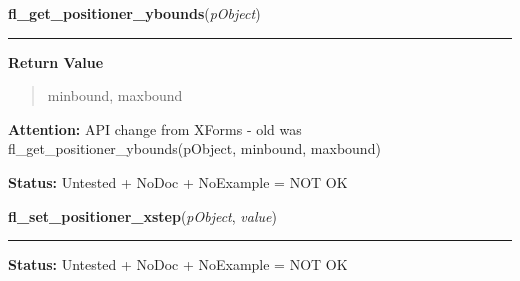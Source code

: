     \label{xformslib:library:fl_get_positioner_ybounds}

    \vspace{0.5ex}

\hspace{.8\funcindent}\begin{boxedminipage}{\funcwidth}

    \raggedright \textbf{fl\_get\_positioner\_ybounds}(\textit{pObject})

    \vspace{-1.5ex}

    \rule{\textwidth}{0.5\fboxrule}
\setlength{\parskip}{2ex}
\setlength{\parskip}{1ex}
      \textbf{Return Value}
    \vspace{-1ex}

      \begin{quote}
      minbound, maxbound

      \end{quote}

\textbf{Attention:} API change from XForms - old was fl\_get\_positioner\_ybounds(pObject, 
minbound, maxbound)



\textbf{Status:} Untested + NoDoc + NoExample = NOT OK



    \end{boxedminipage}

    \label{xformslib:library:fl_set_positioner_xstep}

    \vspace{0.5ex}

\hspace{.8\funcindent}\begin{boxedminipage}{\funcwidth}

    \raggedright \textbf{fl\_set\_positioner\_xstep}(\textit{pObject}, \textit{value})

    \vspace{-1.5ex}

    \rule{\textwidth}{0.5\fboxrule}
\setlength{\parskip}{2ex}
\setlength{\parskip}{1ex}
\textbf{Status:} Untested + NoDoc + NoExample = NOT OK



    \end{boxedminipage}

